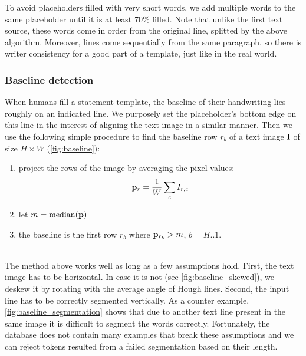 			To avoid placeholders filled with very short words, we add multiple words to the same placeholder until it is at least 70\% filled. Note that unlike the first text source, these words come in order from the original line, splitted by the above algorithm. Moreover, lines come sequentially from the same paragraph, so there is writer consistency for a good part of a template, just like in the real world.


		\subsubsection*{Baseline detection}
			When humans fill a statement template, the baseline of their handwriting lies roughly on an indicated line.  We purposely set the placeholder's bottom edge on this line in the interest of aligning the text image in a similar manner. Then we use the following simple procedure to find the baseline row \(r_b\) of a text image \(\mathrm{I}\) of size \(H \times W\) (\autoref{fig:baseline}):
			\noindent\begin{minipage}{\linewidth}
			\begin{enumerate}
				\item project the rows of the image by averaging the pixel values: \[
					\mathbf{p}_r = \frac{1}{W} \sum_c I_{r,c}
				\]
				\item let \(m = \operatorname{median}(\mathbf{p})\)
				\item the baseline is the first row \(r_b\) where \(\mathbf{p}_{r_b} > m\), \(b = H..1\).
			\end{enumerate}
			\end{minipage}\\

			The method above works well as long as a few assumptions hold. First, the text image has to be horizontal. In case it is not (see \autoref{fig:baseline_skewed}), we deskew it by rotating with the average angle of Hough lines. Second, the input line has to be correctly segmented vertically. As a counter example, \autoref{fig:baseline_segmentation} shows that due to another text line present in the same image it is difficult to segment the words correctly. Fortunately, the database does not contain many examples that break these assumptions and we can reject tokens resulted from a failed segmentation based on their length.

